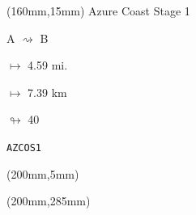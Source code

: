 \begin{textblock*}{40mm}(160mm,15mm)%
Azure Coast Stage 1
\par A $\rightsquigarrow$ B
\Large
\par$\mapsto$ 4.59 mi.
\par$\mapsto$ 7.39 km
\par$\looparrowright$ 40
\par\hfill\tiny\tt AZCOS1\\
\end{textblock*}
\begin{textblock*}{20mm}(200mm,5mm)%
\fbox{\thepage}
\end{textblock*}
\begin{textblock*}{20mm}(200mm,285mm)%
\fbox{\thepage}
\end{textblock*}
\null\newpage


